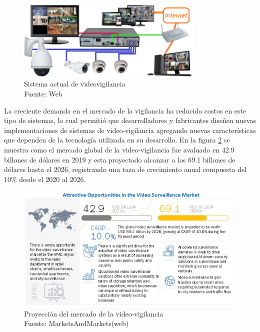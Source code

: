 \begin{figure}[H]
    \begin{center}
        \includegraphics[width=9cm]{img/capitulo_2/sis_videovigilancia.png}
    \end{center}
    \caption{Sistema actual de videovigilancia\\Fuente: Web}
    \label{fig:sistema_video_vigilancia}
\end{figure}

La creciente demanda en el mercado de la vigilancia ha reducido costos en este tipo de sistemas, lo cual permitió que desarrolladores y fabricantes diseñen nuevas implementaciones de sistemas de video-vigilancia agregando nuevas características que dependen de la tecnología utilizada en su desarrollo. En la figura \ref{fig:surveillance-market} se muestra como el mercado global de la video-vigilancia fue avaluado en 42.9 billones de dólares en 2019 y esta proyectado alcanzar a los 69.1 billones de dólares hasta el 2026, registrando una taza de crecimiento anual compuesta del 10\% desde el 2020 al 2026. \cite{marketsandmarkets:market-surveillance}\\

\begin{figure}[H]
    \begin{center}
        \includegraphics[width=13cm]{img/capitulo_2/surveillance-market.jpg}
    \end{center}
    \caption{Proyección del mercado de la video-vigilancia\\Fuente: MarketsAndMarkets(web)}
    \label{fig:surveillance-market}
\end{figure}

